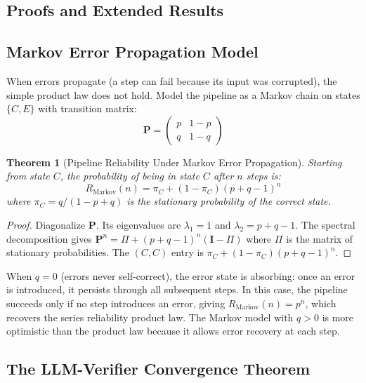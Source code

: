 \documentclass[11pt, a4paper, logo, copyright]{googledeepmind}
\newtheorem{theorem}{Theorem}[section]
\begin{document}
\begin{appendices}
\section{Proofs and Extended Results}
\label{app:proofs}

\subsection{Markov Error Propagation Model}

When errors propagate (a step can fail because its input was corrupted), the simple product law does not hold.
Model the pipeline as a Markov chain on states $\{C, E\}$ with transition matrix:
\begin{equation}
\mathbf{P} = \begin{pmatrix} p & 1 - p \\ q & 1 - q \end{pmatrix}
\end{equation}

\begin{theorem}[Pipeline Reliability Under Markov Error Propagation]
Starting from state $C$, the probability of being in state $C$ after $n$ steps is:
\begin{equation}
R_{\text{Markov}}(n) = \pi_C + (1 - \pi_C)(p + q - 1)^n
\end{equation}
where $\pi_C = q/(1 - p + q)$ is the stationary probability of the correct state.
\end{theorem}

\begin{proof}
Diagonalize $\mathbf{P}$.
Its eigenvalues are $\lambda_1 = 1$ and $\lambda_2 = p + q - 1$.
The spectral decomposition gives $\mathbf{P}^n = \Pi + (p+q-1)^n(\mathbf{I} - \Pi)$ where $\Pi$ is the matrix of stationary probabilities.
The $(C,C)$ entry is $\pi_C + (1 - \pi_C)(p+q-1)^n$.
\end{proof}

When $q = 0$ (errors never self-correct), the error state is absorbing: once an error is introduced, it persists through all subsequent steps.
In this case, the pipeline succeeds only if no step introduces an error, giving $R_{\text{Markov}}(n) = p^n$, which recovers the series reliability product law.
The Markov model with $q > 0$ is more optimistic than the product law because it allows error recovery at each step.

\subsection{The LLM-Verifier Convergence Theorem}


\end{appendices}
\end{document}
